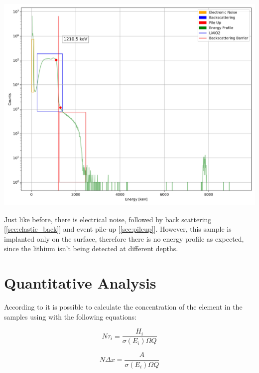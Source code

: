 \documentclass{article}
\begin{document}
\begin{multicols}{2}
\begin{center}
    \label{TT_21}
    \centering
    \includegraphics[scale = 0.3]{../../images/FullAnalysisImplanted.jpeg}
\end{center}

Just like before, there is electrical noise, followed by back scattering [\ref{sec:elastic_back}] and event pile-up [\ref{sec:pileup}].
However, this sample is implanted only on the surface, therefore there is no energy profile as expected, since the lithium isn't being detected at different depths.

\section{Quantitative Analysis}
    \label{sec:quantitative}

According to \cite{chu1978backscattering} it is possible to calculate the concentration of the element in the samples using with the following equations:

\begin{minipage}[t]{0.5\linewidth-0.5em} %
    \vspace{0pt} %
    \vspace{\dimexpr\ht\strutbox-\topskip}%
    \begin{equation}
        N\tau_i=\frac{H_i}{\sigma (E_i)\Omega Q}
    \end{equation}
\end{minipage}\hfill
\begin{minipage}[t]{0.5\linewidth-0.5em} %
    \vspace{0pt} %
    \begin{equation}
        N\Delta x=\frac{A}{\sigma (E_i)\Omega Q}
    \end{equation}
\end{minipage}


\end{multicols}
\end{document}

